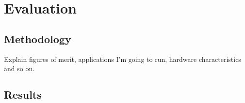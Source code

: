 \section{Evaluation}
\label{sec:evaluation}

\subsection{Methodology}

Explain figures of merit, applications I'm going to run, hardware characteristics and so on.

\subsection{Results}

